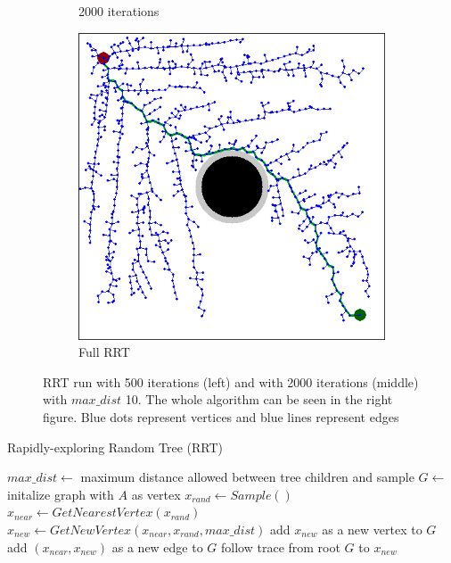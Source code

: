 \begin{figure}[]
\begin{subfigure}[b]{0.3\linewidth}
     \caption{2000 iterations}
  \end{subfigure}
  \hfill
  \begin{subfigure}[b]{0.3\linewidth}
    \includegraphics[width=\linewidth]{images/screenshot_39.png}
     \caption{Full RRT}
  \end{subfigure}
  \caption{RRT run with 500 iterations (left) and with 2000 iterations (middle) with $max\_dist$ 10. The whole algorithm can be seen in the right figure. Blue dots represent vertices and blue lines represent edges}
  \label{fig:RRT_example}
\end{figure}

\begin{algorithm}
\caption{Rapidly-exploring Random Tree (RRT)}
\label{alg: RRT}
\begin{algorithmic}[1]

    \State $max\_dist \gets$ maximum distance
    allowed between tree children and sample
    \State $G \gets$ initalize graph with $A$ as vertex
        \State $x_{rand} \gets \textit{Sample}()$
        \State $x_{near} \gets \textit{GetNearestVertex}(x_{rand})$
        \State $x_{new} \gets \textit{GetNewVertex}(x_{near}, x_{rand}, max\_dist)$
        \State
            \State add $x_{new}$ as a new vertex to $G$
            \State add $(x_{near}, x_{new})$ as a new edge to $G$
        \EndIf
        \State
            \State follow trace from root $G$ to $x_{new}$
            \State \Return 
        \EndIf
    \EndWhile
\EndProcedure
\end{algorithmic}
\end{algorithm}

